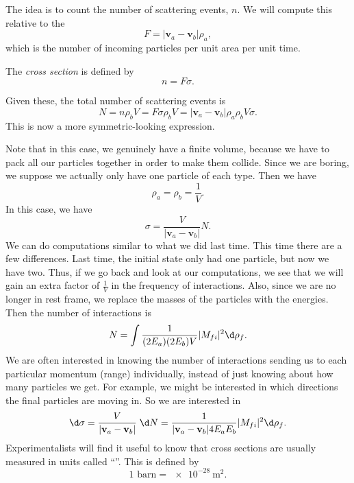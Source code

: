 \documentclass[a4paper]{article}
\begin{document}
The idea is to count the number of scattering events, $n$. We will compute this relative to the 
\[
  F = |\mathbf{v}_a - \mathbf{v}_b| \rho_a,
\]
which is the number of incoming particles per unit area per unit time.
\begin{defi}
  The \emph{cross section}\index{$\sigma$} is defined by
  \[
    n = F \sigma.
  \]
\end{defi}
Given these, the total number of scattering events is
\[
  N = n \rho_b V = F \sigma \rho_b V = |\mathbf{v}_a - \mathbf{v}_b| \rho_a \rho_b V \sigma.
\]
This is now a more symmetric-looking expression.

Note that in this case, we genuinely have a finite volume, because we have to pack all our particles together in order to make them collide. Since we are boring, we suppose we actually only have one particle of each type. Then we have
\[
  \rho_a = \rho_b = \frac{1}{V}.
\]
In this case, we have
\[
  \sigma = \frac{V}{|\mathbf{v}_a - \mathbf{v}_b|} N.
\]
We can do computations similar to what we did last time. This time there are a few differences. Last time, the initial state only had one particle, but now we have two. Thus, if we go back and look at our computations, we see that we will gain an extra factor of $\frac{1}{V}$ in the frequency of interactions. Also, since we are no longer in rest frame, we replace the masses of the particles with the energies. Then the number of interactions is
\[
  N = \int \frac{1}{(2E_a) (2 E_b) V} |M_{fi}|^2 \d \rho_f.
\]
We are often interested in knowing the number of interactions sending us to each particular momentum (range) individually, instead of just knowing about how many particles we get. For example, we might be interested in which directions the final particles are moving in. So we are interested in
\[
  \d \sigma = \frac{V}{|\mathbf{v}_a - \mathbf{v}_b|}\; \d N = \frac{1}{|\mathbf{v}_a - \mathbf{v}_b| 4E_a E_b} |M_{fi}|^2 \d \rho_f.
\]
Experimentalists will find it useful to know that cross sections are usually measured in units called ``''. This is defined by
\[
  1\text{ barn} = \SI{e-28}{\meter\squared}.
\]
\end{document}
